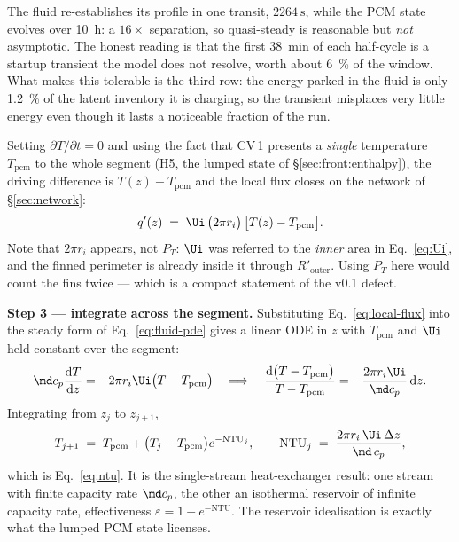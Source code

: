\noindent
The fluid re-establishes its profile in one transit, $\SI{2264}{\second}$,
while the PCM state evolves over \SI{10}{\hour}: a $16\times$ separation, so
quasi-steady is reasonable but \emph{not} asymptotic. The honest reading is
that the first \SI{38}{\minute} of each half-cycle is a startup transient the
model does not resolve, worth about \SI{6}{\percent} of the window. What makes
this tolerable is the third row: the energy parked in the fluid is only
\SI{1.2}{\percent} of the latent inventory it is charging, so the transient
misplaces very little energy even though it lasts a noticeable fraction of the
run.

Setting $\partial T/\partial t = 0$ and using the fact that CV\,1 presents a
\emph{single} temperature $T_{\mathrm{pcm}}$ to the whole segment
(H5, the lumped state of \S\ref{sec:front:enthalpy}), the driving difference is
$T(z)-T_{\mathrm{pcm}}$ and the local flux closes on the network of
\S\ref{sec:network}:
\begin{equation}
  q'(z) \;=\; \Ui\,\bigl(2\pi r_{i}\bigr)\,\bigl[T(z)-T_{\mathrm{pcm}}\bigr].
  \label{eq:local-flux}
\end{equation}
Note that $2\pi r_{i}$ appears, not $P_{T}$: $\Ui$ was referred to the
\emph{inner} area in Eq.~\eqref{eq:Ui}, and the finned perimeter is already
inside it through $R'_{\mathrm{outer}}$. Using $P_{T}$ here would count the fins
twice --- which is a compact statement of the v0.1 defect.

\medskip
\noindent\textbf{Step 3 --- integrate across the segment.}
Substituting Eq.~\eqref{eq:local-flux} into the steady form of
Eq.~\eqref{eq:fluid-pde} gives a linear ODE in $z$ with $T_{\mathrm{pcm}}$ and
$\Ui$ held constant over the segment:
\begin{equation}
  \md c_{p}\frac{\mathrm{d}T}{\mathrm{d}z}
  = -2\pi r_{i}\Ui\bigl(T-T_{\mathrm{pcm}}\bigr)
  \quad\Longrightarrow\quad
  \frac{\mathrm{d}\bigl(T-T_{\mathrm{pcm}}\bigr)}{T-T_{\mathrm{pcm}}}
  = -\frac{2\pi r_{i}\Ui}{\md c_{p}}\,\mathrm{d}z .
\end{equation}
Integrating from $z_{j}$ to $z_{j+1}$,
\begin{equation}
  T_{j+1} \;=\; T_{\mathrm{pcm}}
    + \bigl(T_{j}-T_{\mathrm{pcm}}\bigr)e^{-\mathrm{NTU}_{j}},
  \qquad
  \mathrm{NTU}_{j} \;=\; \frac{2\pi r_{i}\,\Ui\,\Delta z}{\md\,c_{p}},
  \label{eq:ntu-derived}
\end{equation}
which is Eq.~\eqref{eq:ntu}. It is the single-stream heat-exchanger result: one
stream with finite capacity rate $\md c_{p}$, the other an isothermal reservoir
of infinite capacity rate, effectiveness $\varepsilon = 1-e^{-\mathrm{NTU}}$.
The reservoir idealisation is exactly what the lumped PCM state licenses.

